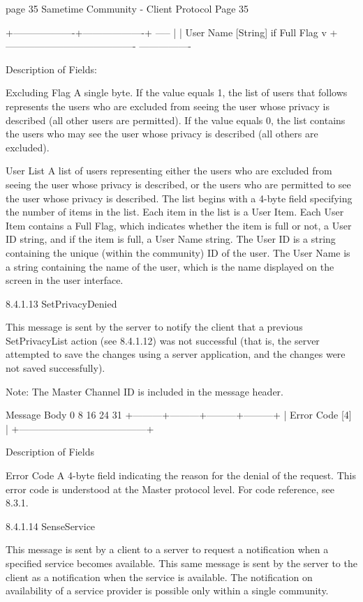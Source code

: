 \documentclass[titlepage,oneside]{book}
\begin{document}
page 35  Sametime Community - Client Protocol   Page 35

+-------------------+-------------------+  -----          |
| User Name [String]                       if Full Flag   v
+----------------------------------------  ----------------


Description of Fields:

Excluding Flag
  A single byte. If the value equals 1, the list of users that follows
  represents the users who are excluded from seeing the user whose
  privacy is described (all other users are permitted). If the value
  equals 0, the list contains the users who may see the user whose
  privacy is described (all others are excluded).

User List
  A list of users representing either the users who are excluded from
  seeing the user whose privacy is described, or the users who are
  permitted to see the user whose privacy is described. The list begins
  with a 4-byte field specifying the number of items in the list. Each
  item in the list is a User Item. Each User Item contains a Full Flag,
  which indicates whether the item is full or not, a User ID string,
  and if the item is full, a User Name string. The User ID is a string
  containing the unique (within the community) ID of the user. The User
  Name is a string containing the name of the user, which is the name
  displayed on the screen in the user interface.


8.4.1.13 SetPrivacyDenied

This message is sent by the server to notify the client that a previous
SetPrivacyList action (see 8.4.1.12) was not successful
(that is, the server attempted to save the changes using a server
application, and the changes were not saved successfully).

Note: The Master Channel ID is included in the message header.

Message Body
0         8         16        24      31
+---------+---------+---------+---------+
|             Error Code [4]            |
+---------------------------------------+

Description of Fields

Error Code
  A 4-byte field indicating the reason for the denial of the
  request. This error code is understood at the Master protocol
  level. For code reference, see 8.3.1.


8.4.1.14 SenseService

This message is sent by a client to a server to request a notification
when a specified service becomes available. This same message is sent
by the server to the client as a notification when the service is
available. The notification on availability of a service provider is
possible only within a single community.
\end{document}
